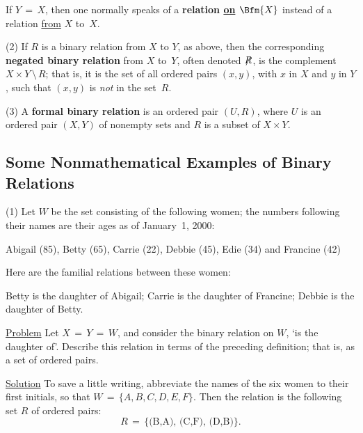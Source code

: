{        If $Y \,=\, X$, then one normally speaks of a {\bf relation \underline{on} $\Bfm{X}$} instead of a relation \underline{from} $X$ to~$X$.

        (2) If $R$ is a binary relation from $X$ to $Y$, as above, then the corresponding
    {\bf negated binary relation} from $X$ to~$Y$, often denoted ${\not}R$,
    is the complement $X{\times}Y\,{\setminus}\,R$; that is, it is the set of all ordered pairs $(x,y)$, with $x$ in $X$ and $y$ in $Y$, such that $(x,y)$ is {\em not} in the set~$R$.

        (3) A {\bf formal binary relation} is an ordered pair $(U,R)$,
    where $U$ is an ordered pair $(X,Y)$ of nonempty sets and $R$ is a subset of $X{\times}Y$.

\VV

        \subsection{\small{{\bf Some Nonmathematical Examples of Binary Relations}}}
        \label{ExampA12.65A}

\V


        (1) Let $W$ be the set consisting of the following women; the numbers following their names are their ages as of January~1, 2000:

        \begin{center}
        Abigail (85), Betty (65), Carrie (22), Debbie (45), Edie (34) and Francine (42)
        \end{center}

        Here are the familial relations between these women:


        Betty is the daughter of Abigail; Carrie is the daughter of Francine; Debbie is the daughter of Betty.

        \underline{Problem} Let $X \,=\, Y \,=\, W$, and consider the binary relation on $W$, `is the daughter of'.
    Describe this relation in terms of the preceding definition; that is, as a set of ordered pairs.

        \underline{Solution} To save a little writing, abbreviate the names of the six women to their first initials, so that $W \,=\, \{A,B,C,D,E,F\}$.
    Then the relation is the following set $R$ of ordered pairs:
        \begin{displaymath}
        R \,=\, \mbox{\{(B,A), (C,F), (D,B)\}.}
        \end{displaymath}

}

